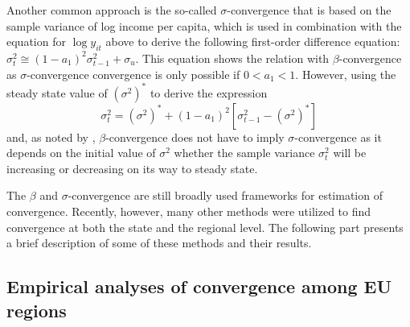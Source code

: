 \documentclass[11pt]{article}
\begin{document}
Another common approach is the so-called $\sigma$-convergence that is based on the sample variance of log income per capita, which is used in combination with the equation for $\log y_{it}$ above to derive the following first-order difference equation:
 \(
\sigma_{t}^{2} \cong (1-a_{1})^2\sigma_{t-1}^{2} + \sigma_{u}\).
This equation shows the relation with $\beta$-convergence as $\sigma$-convergence convergence is only possible if \(0 < a_{1} < 1\). However, using the steady state value of $(\sigma^{2})^{*}$ to derive the expression \begin{equation} \label{eq2}\sigma_{t}^{2} = (\sigma^{2})^{*} + (1-a_{1})^2[\sigma_{t-1}^{2} - (\sigma^{2})^{*}] \end{equation}
and, as noted by \citet{sala1996regional},  $\beta$-convergence does not have to imply $\sigma$-convergence as it depends on the initial value of $\sigma^{2}$ whether the sample variance  $\sigma_{t}^{2}$ will be increasing or decreasing on its way to steady state.

The $\beta$ and $\sigma$-convergence are still broadly used frameworks for estimation of convergence. Recently, however, many other methods were utilized to find convergence at both the state and the regional level. The following part presents a brief description of some of these methods and their results.
  
 \subsection{Empirical analyses of convergence among EU regions}
\end{document}
